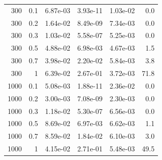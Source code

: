 {\begin{longtable}{rrrrrr}
300 & 0.1 & 6.87e-03 & 3.93e-11 & 1.03e-02 & 0.0 \\
300 & 0.2 & 1.64e-02 & 8.49e-09 & 7.34e-03 & 0.0 \\
300 & 0.3 & 1.03e-02 & 5.58e-07 & 5.25e-03 & 0.0 \\
300 & 0.5 & 4.88e-02 & 6.98e-03 & 4.67e-03 & 1.5 \\
300 & 0.7 & 3.98e-02 & 2.20e-02 & 5.84e-03 & 3.8 \\
300 & 1 & 6.39e-02 & 2.67e-01 & 3.72e-03 & 71.8 \\
1000 & 0.1 & 5.08e-03 & 1.88e-11 & 2.36e-02 & 0.0 \\
1000 & 0.2 & 3.00e-03 & 7.08e-09 & 2.30e-03 & 0.0 \\
1000 & 0.3 & 1.18e-02 & 5.30e-07 & 6.56e-03 & 0.0 \\
1000 & 0.5 & 8.69e-02 & 6.97e-03 & 6.62e-03 & 1.1 \\
1000 & 0.7 & 8.59e-02 & 1.84e-02 & 6.10e-03 & 3.0 \\
1000 & 1 & 4.15e-02 & 2.71e-01 & 5.48e-03 & 49.5 \\
\bottomrule
\end{longtable}}
